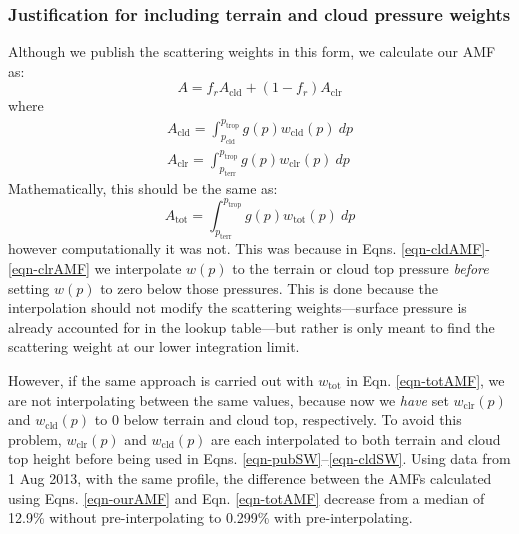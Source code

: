 \documentclass[12pt]{article}
\begin{document}
	\subsubsection{Justification for including terrain and cloud pressure weights}
	Although we publish the scattering weights in this form, we calculate our AMF as:
	\begin{equation} \label{eqn-ourAMF}
		A = f_r A_\mathrm{cld} + (1-f_r) A_\mathrm{clr}
	\end{equation}
	where
	\begin{align}
		A_\mathrm{cld} = \int_{p_\mathrm{cld}}^{p_\mathrm{trop}} g(p) w_{\mathrm{cld}}(p) \: dp \label{eqn-cldAMF} \\
		A_\mathrm{clr} = \int_{p_\mathrm{terr}}^{p_\mathrm{trop}} g(p) w_{\mathrm{clr}}(p) \: dp \label{eqn-clrAMF}
	\end{align}
	Mathematically, this should be the same as:
	\begin{equation} \label{eqn-totAMF}
		A_\mathrm{tot} = \int_{p_\mathrm{terr}}^{p_\mathrm{trop}} g(p) w_{\mathrm{tot}}(p) \: dp
	\end{equation}
	however computationally it was not.  This was because in Eqns. \ref{eqn-cldAMF}-\ref{eqn-clrAMF} we interpolate $w(p)$ to the terrain or cloud top pressure \emph{before} setting $w(p)$ to zero below those pressures.  This is done because the interpolation should not modify the scattering weights---surface pressure is already accounted for in the lookup table---but rather is only meant to find the scattering weight at our lower integration limit.
	
	However, if the same approach is carried out with $w_\mathrm{tot}$ in Eqn. \ref{eqn-totAMF}, we are not interpolating between the same values, because now we \emph{have} set $w_\mathrm{clr}(p)$ and $w_\mathrm{cld}(p)$ to 0 below terrain and cloud top, respectively.  To avoid this problem, $w_\mathrm{clr}(p)$ and $w_\mathrm{cld}(p)$ are each interpolated to both terrain and cloud top height before being used in Eqns. \ref{eqn-pubSW}--\ref{eqn-cldSW}.  Using data from 1 Aug 2013, with the same  profile, the difference between the AMFs calculated using Eqns. \ref{eqn-ourAMF} and Eqn. \ref{eqn-totAMF} decrease from a median of 12.9\% without pre-interpolating to 0.299\% with pre-interpolating.
	


\end{document}
